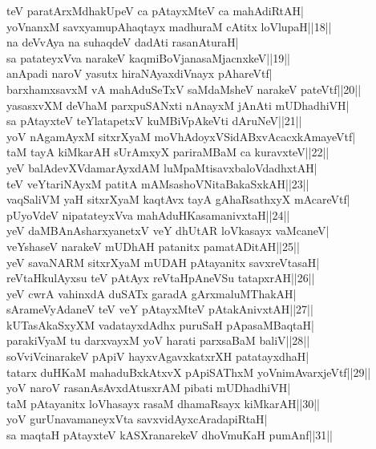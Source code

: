 \documentclass{article}
\begin{document}
teV paratArxMdhakUpeV ca pAtayxMteV ca mahAdiRtAH|\\
yoVnanxM savxyamupAhaqtayx madhuraM cAtitx loVlupaH||18||\\
na deVvAya na suhaqdeV dadAti rasanAturaH|\\
sa patateyxVva narakeV kaqmiBoVjanasaMjacnxkeV||19||\\
anApadi naroV yasutx hiraNAyaxdiVnayx pAhareVtf|\\
barxhamxsavxM vA mahAduSeTxV saMdaMsheV narakeV pateVtf||20||\\
yasasxvXM deVhaM parxpuSANxti nAnayxM jAnAti mUDhadhiVH|\\
sa pAtayxteV teYlatapetxV kuMBiVpAkeVti dAruNeV||21||\\
yoV nAgamAyxM sitxrXyaM moVhAdoyxVSidABxvAcacxkAmayeVtf|\\
taM tayA kiMkarAH sUrAmxyX pariraMBaM ca kuravxteV||22||\\
yeV balAdevXVdamarAyxdAM luMpaMtisavxbaloVdadhxtAH|\\
teV veYtariNAyxM patitA mAMsashoVNitaBakaSxkAH||23||\\
vaqSaliVM yaH sitxrXyaM kaqtAvx tayA gAhaRsathxyX mAcareVtf|\\
pUyoVdeV nipatateyxVva mahAduHKasamanivxtaH||24||\\
yeV daMBAnAsharxyanetxV veY dhUtAR loVkasayx vaMcaneV|\\
veYshaseV narakeV mUDhAH patanitx pamatADitAH||25||\\
yeV savaNARM sitxrXyaM mUDAH pAtayanitx savxreVtasaH|\\
reVtaHkulAyxsu teV pAtAyx reVtaHpAneVSu tatapxrAH||26||\\
yeV cwrA vahinxdA duSATx garadA gArxmaluMThakAH|\\
sArameVyAdaneV teV veY pAtayxMteV pAtakAnivxtAH||27||\\
kUTasAkaSxyXM vadatayxdAdhx puruSaH pApasaMBaqtaH|\\
parakiVyaM tu darxvayxM yoV harati parxsaBaM baliV||28||\\
soVviVcinarakeV pApiV hayxvAgavxkatxrXH patatayxdhaH|\\
tatarx duHKaM mahaduBxkAtxvX pApiSAThxM yoVnimAvarxjeVtf||29||\\
yoV naroV rasanAsAvxdAtusxrAM pibati mUDhadhiVH|\\
taM pAtayanitx loVhasayx rasaM dhamaRsayx kiMkarAH||30||\\
yoV gurUnavamaneyxVta savxvidAyxcAradapiRtaH|\\
sa maqtaH pAtayxteV kASXranarekeV dhoVmuKaH pumAnf||31||\\
\end{document}
